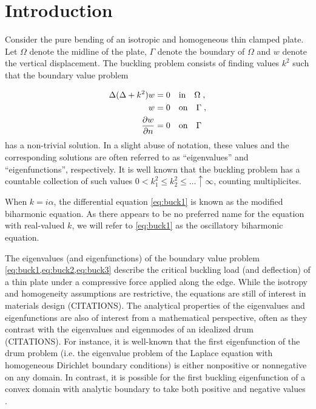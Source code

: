 \section{Introduction}


Consider the pure bending of an isotropic and homogeneous thin clamped
plate. 
Let $\Omega$ denote the midline of the plate, $\Gamma$ denote the 
boundary of $\Omega$ and $w$ denote the vertical displacement.
The buckling problem consists of finding 
values $k^{2}$ such that the boundary value problem

\begin{align}
\Delta (\Delta + k^2) w &= 0 \quad \textrm{in} \quad \Omega \label{eq:buck1} \; , \\
w &= 0 \quad \textrm{on} \quad \Gamma \label{eq:buck2} \; ,\\
\frac{\partial w}{\partial n} &=0 \quad \textrm{on} \quad \Gamma \label{eq:buck3} 
\end{align}
has a non-trivial solution. In a slight abuse of notation,
these values and the corresponding solutions are often
referred to as ``eigenvalues'' and ``eigenfunctions'',
respectively. 
It is well known that the buckling problem has a
countable collection of such values
$0 < k_{1}^{2} \leq k_{2}^2 \leq \ldots \uparrow \infty$,
counting multiplicites.

\begin{remark}
  When $k = i\alpha$, the differential equation
  \cref{eq:buck1} is known as the modified biharmonic
  equation. As there appears to be no preferred
  name for the equation with real-valued $k$,
  we will refer to \cref{eq:buck1} as the
  oscillatory biharmonic equation.
\end{remark}

The eigenvalues (and eigenfunctions)
of the boundary value problem \cref{eq:buck1,eq:buck2,eq:buck3}
describe the critical buckling load (and deflection)
of a thin plate under
a compressive force applied along the edge. While the
isotropy and homogeneity assumptions are restrictive,
the equations are still of interest in materials design
(CITATIONS). The analytical properties of the eigenvalues and
eigenfunctions are also of interest from a mathematical
perspective, often as they contrast with the eigenvalues
and eigenmodes of an idealized drum (CITATIONS). For instance,
it is well-known that the first eigenfunction of the
drum problem (i.e. the eigenvalue problem of the Laplace
equation with homogeneous Dirichlet boundary conditions)
is either nonpositive or nonnegative on any domain.
In contrast, it is possible for the first buckling
eigenfunction of a convex domain with analytic boundary
to take both positive and negative values \cite{antunes2011buckling}.

